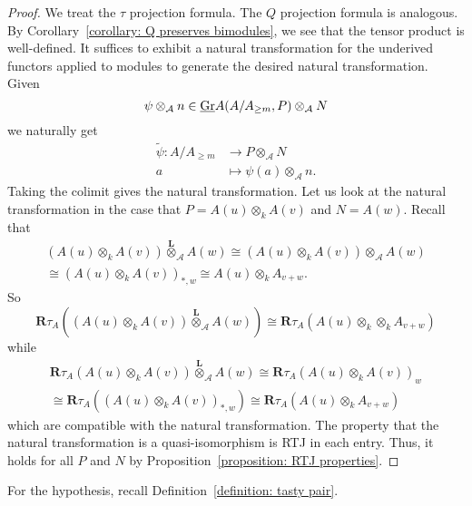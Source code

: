 \documentclass[dissertation.tex]{subfiles}
\begin{document}
\begin{proof}
  We treat the \(\tau\) projection formula. The \(Q\) projection formula is analogous. By Corollary~\ref{corollary: Q preserves bimodules}, we see that the tensor product is well-defined. It suffices to exhibit a natural transformation for the underived functors applied to modules to generate the desired natural transformation. Given
  \begin{displaymath}
    \psi \otimes_{\mathcal A} n \in \underline{\operatorname{Gr}}A(A/A_{\geq m}, P) \otimes_{\mathcal A} N 
  \end{displaymath}
  we naturally get 
  \begin{align*}
    \widetilde{\psi} : A/A_{\geq m} & \to P \otimes_{\mathcal A} N \\
    a & \mapsto \psi(a) \otimes_{\mathcal A} n. 
  \end{align*}
  Taking the colimit gives the natural transformation. Let us look at the natural transformation in the case that \(P = A(u) \otimes_k A(v)\) and \(N = A(w)\). Recall that 
  \begin{gather*}
    \left( A(u) \otimes_k A(v) \right) \overset{\mathbf{L}}{\otimes}_{\mathcal A} A(w) \cong \left( A(u) \otimes_k A(v) \right) \otimes_{\mathcal A} A(w) \\ \cong \left( A(u) \otimes_k A(v) \right)_{\ast,w} \cong A(u) \otimes_k A_{v+w}. 
  \end{gather*}
  So
  \begin{displaymath}
    \mathbf{R}\tau_A \left( \left( A(u) \otimes_k A(v) \right) \overset{\mathbf{L}}{\otimes}_{\mathcal A} A(w) \right) \cong \mathbf{R} \tau_A \left( A(u) \otimes_k \otimes_k A_{v+w} \right)
  \end{displaymath}
  while 
  \begin{gather*}
    \mathbf{R}\tau_A \left( A(u) \otimes_k A(v) \right) \overset{\mathbf{L}}{\otimes}_{\mathcal A} A(w) \cong \mathbf{R}\tau_A \left( A(u) \otimes_k A(v) \right)_w \\ \cong \mathbf{R}\tau_A \left( (A(u) \otimes_k A(v))_{\ast,w} \right) \cong \mathbf{R}\tau_A \left( A(u) \otimes_k A_{v+w} \right)
  \end{gather*}
  which are compatible with the natural transformation. The property that the natural transformation is a quasi-isomorphism is RTJ in each entry. Thus, it holds for all \(P\) and \(N\) by Proposition~\ref{proposition: RTJ properties}. 
\end{proof}

For the hypothesis, recall Definition~\ref{definition: tasty pair}. 
\end{document}
